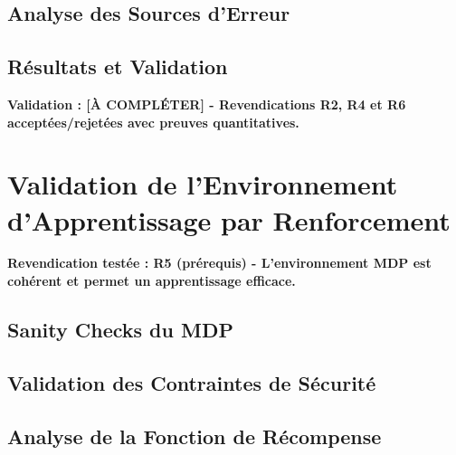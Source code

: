 \subsection{Analyse des Sources d'Erreur}
\label{subsec:analyse_erreurs}


\subsection{Résultats et Validation}
\label{subsec:resultats_jumeau}

\textbf{Validation : [À COMPLÉTER] - Revendications R2, R4 et R6 acceptées/rejetées avec preuves quantitatives.}

\section{Validation de l'Environnement d'Apprentissage par Renforcement}
\label{sec:validation_env_rl}

\textbf{Revendication testée : R5 (prérequis) - L'environnement MDP est cohérent et permet un apprentissage efficace.}

\subsection{Sanity Checks du MDP}
\label{subsec:sanity_checks_mdp}

\subsection{Validation des Contraintes de Sécurité}
\label{subsec:contraintes_securite}

\subsection{Analyse de la Fonction de Récompense}
\label{subsec:analyse_recompense}

